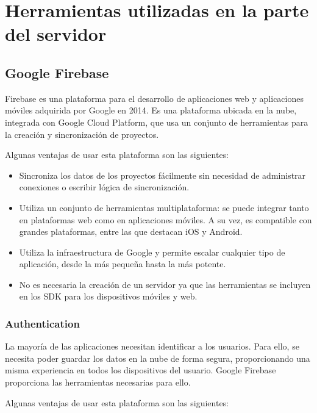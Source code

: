 \section{Herramientas utilizadas en la parte del servidor}
\subsection{Google Firebase} \label{google_firebase_tools}
Firebase \cite{firebase} es una plataforma para el desarrollo de aplicaciones web y aplicaciones móviles adquirida por Google en 2014.
Es una plataforma ubicada en la nube, integrada con Google Cloud Platform, que usa un conjunto de herramientas para la creación y sincronización de proyectos.

Algunas ventajas de usar esta plataforma son las siguientes:
\begin{itemize}
    \item Sincroniza los datos de los proyectos fácilmente sin necesidad de administrar conexiones o escribir lógica de sincronización.
    \item Utiliza un conjunto de herramientas multiplataforma: se puede integrar tanto en plataformas web como en aplicaciones móviles. A su vez, es compatible con grandes plataformas, entre las que destacan iOS y Android.
    \item Utiliza la infraestructura de Google y permite escalar cualquier tipo de aplicación, desde la más pequeña hasta la más potente.
    \item No es necesaria la creación de un servidor ya que las herramientas se incluyen en los SDK para los dispositivos móviles y web.
\end{itemize}

\subsubsection{Authentication} \label{google_firebase_tools_auth}
La mayoría de las aplicaciones necesitan identificar a los usuarios. Para ello, se necesita poder guardar los datos en la nube de forma segura, proporcionando una misma experiencia en todos los dispositivos del usuario. Google Firebase proporciona las herramientas necesarias para ello.

Algunas ventajas de usar esta plataforma son las siguientes:

